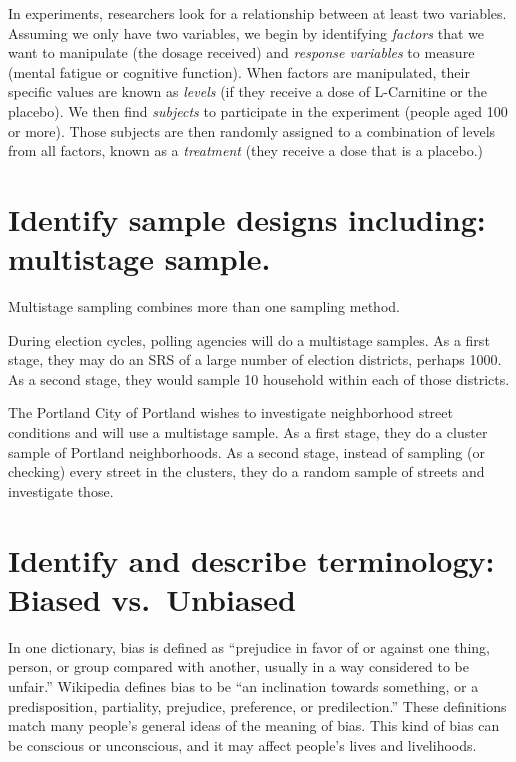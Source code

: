 In experiments, researchers look for a relationship between at least two variables. Assuming we only have two variables, we begin by identifying \emph{factors} that we want to manipulate (the dosage received) and \emph{response variables} to measure (mental fatigue or cognitive function). When factors are manipulated, their specific values are known as \emph{levels} (if they receive a dose of L-Carnitine or the placebo). We then find \emph{subjects} to participate in the experiment (people aged 100 or more). Those subjects are then randomly assigned to a combination of levels from all factors, known as a \emph{treatment} (they receive a dose that is a placebo.)


\section[Multistage Sampling]{Identify sample designs including: multistage sample.}

Multistage sampling combines more than one sampling method.  

\begin{example}
During election cycles, polling agencies will do a multistage samples.  As a first stage, they may do an SRS of a large number of election districts, perhaps 1000.  As a second stage, they would sample 10 household within each of those districts.
\end{example}

\begin{example}
The Portland City of Portland wishes to investigate neighborhood street conditions and will use a multistage sample.  As a first stage, they do a cluster sample of Portland neighborhoods.  As a second stage, instead of sampling (or checking) every street in the clusters, they do a random sample of streets and investigate those.
\end{example}

\section[Biased vs.~Unbiased]{Identify and describe terminology: Biased vs.~Unbiased}

In one dictionary, bias is defined as ``prejudice in favor of or against one thing, person, or group compared with another, usually in a way considered to be unfair.'' Wikipedia defines bias to be ``an inclination towards something, or a predisposition, partiality, prejudice, preference, or predilection.'' These definitions match many people's general ideas of the meaning of bias. This kind of bias can be conscious or unconscious, and it may affect people's lives and livelihoods.

